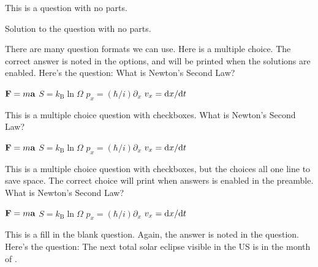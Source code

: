 \begin{questions}
\question[5] \label{ques:questionnoparts}
This is a question with no parts.
\droppoints

\begin{solution}
Solution to the question with no parts.
\end{solution}


\question[10] \label{ques:questionmc}
There are many question formats we can use. Here is a multiple choice. The correct answer is noted in the options, and will be printed when the solutions are enabled. Here's the question: What is Newton's Second Law?

\begin{choices}
\correctchoice $\vb{F} = m \vb{a}$
\choice $S = k_\text{B} \ln\Omega$
\choice $p_x = (\hbar/i) \partial_x$
\choice $v_x = \difs xt$
\end{choices}
\droppoints


\question[10] \label{ques:questionmcbox}
This is a multiple choice question with checkboxes. What is Newton's Second Law?

\begin{checkboxes}
\correctchoice $\vb{F} = m \vb{a}$
\choice $S = k_\text{B} \ln\Omega$
\choice $p_x = (\hbar/i) \partial_x$
\choice $v_x = \difs xt$
\end{checkboxes}
\droppoints


\question[10] \label{ques:questionmclinebox}
This is a multiple choice question with checkboxes, but the choices all one line to save space. The correct choice will print when answers is enabled in the preamble. What is Newton's Second Law?

\begin{oneparcheckboxes}
\correctchoice $\vb{F} = m \vb{a}$
\choice $S = k_\text{B} \ln\Omega$
\choice $p_x = (\hbar/i) \partial_x$
\choice $v_x = \difs xt$
\end{oneparcheckboxes}
\droppoints


\question[10] \label{ques:questionfillin}
This is a fill in the blank question. Again, the answer is noted in the question. Here's the question: 
The next total solar eclipse visible in the US is in the month of \fillin[April].
\droppoints



\end{questions}
